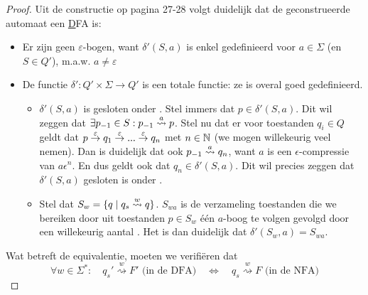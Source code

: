 \documentclass[../aanvullingen_cursus.tex]{subfiles}
\begin{document}
\begin{proof}
	Uit de constructie op pagina 27-28 volgt duidelijk dat de geconstrueerde automaat een \underline{D}FA is:
	\begin{itemize}
		\item Er zijn geen \( \varepsilon \)-bogen, want \( \delta'(S,a) \) is enkel gedefinieerd voor \( a \in \Sigma \) (en \( S\in Q' \)), m.a.w. \( a\neq \varepsilon \)
		\item De functie \( \delta':Q' \times \Sigma \to Q' \) is een totale functie: ze is overal goed gedefinieerd.
		\begin{itemize}
			\item \(\delta'(S,a)\) is gesloten onder \epsilonbogen. Stel immers dat \(p \in \delta'(S,a)\). Dit wil zeggen dat \(\exists p_{-1} \in S : p_{-1}\overset{a}{\rightsquigarrow}p\). Stel nu dat er voor toestanden \(q_i\in Q\) geldt dat \(p\overset{\varepsilon}{\rightarrow}q_1\overset{\varepsilon}{\rightarrow}...\overset{\varepsilon}{\rightarrow}q_n\) met \(n\in \mathbb{N}\) (we mogen willekeurig veel \epsilonbogens nemen). Dan is duidelijk dat ook \(p_{-1}\overset{a}{\rightsquigarrow}q_n\), want \(a\) is een \(\epsilon\)-compressie van \(a\epsilon^n\). En dus geldt ook dat \(q_n \in \delta'(S,a)\). Dit wil precies zeggen dat \(\delta'(S,a)\) gesloten is onder \epsilonbogen.
			\item Stel dat \(S_w=\{q \mid q_s \overset{w}{\rightsquigarrow} q\}\). \(S_{wa}\) is de verzameling toestanden die we bereiken door uit toestanden \(p \in S_w\) één \(a\)-boog te volgen gevolgd door een willekeurig aantal \epsilonbogen. Het is dan duidelijk dat  \(\delta'(S_w,a)=S_{wa}\).
		\end{itemize}
	\end{itemize}

	Wat betreft de equivalentie, moeten we verifiëren dat \[ \forall w \in \Sigma^*: \quad q_s' \overset{w}{\rightsquigarrow} F'  \text{ (in de DFA)} \quad \Longleftrightarrow \quad q_s \overset{w}{\rightsquigarrow} F \text{ (in de NFA)}\]


\end{proof}
\end{document}
